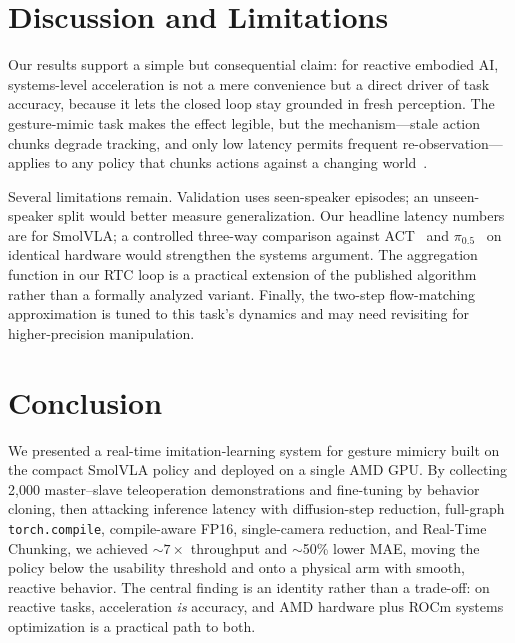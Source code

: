 \documentclass[blind]{gtac}
\begin{document}
\section{Discussion and Limitations}
\label{sec:discussion}

Our results support a simple but consequential claim: for reactive embodied AI,
systems-level acceleration is not a mere convenience but a direct driver of task
accuracy, because it lets the closed loop stay grounded in fresh perception. The
gesture-mimic task makes the effect legible, but the mechanism---stale action
chunks degrade tracking, and only low latency permits frequent
re-observation---applies to any policy that chunks actions against a changing
world~\cite{rtc}.

Several limitations remain. Validation uses seen-speaker episodes; an
unseen-speaker split would better measure generalization. Our headline latency
numbers are for SmolVLA; a controlled three-way comparison against
ACT~\cite{act} and $\pi_{0.5}$~\cite{pi05} on identical hardware would strengthen
the systems argument. The aggregation function in our RTC loop is a practical
extension of the published algorithm~\cite{rtc,smolvla} rather than a formally
analyzed variant. Finally, the two-step flow-matching approximation is tuned to
this task's dynamics and may need revisiting for higher-precision manipulation.

\section{Conclusion}
\label{sec:conclusion}

We presented a real-time imitation-learning system for gesture mimicry built on
the compact SmolVLA policy and deployed on a single AMD GPU. By collecting 2{,}000
master--slave teleoperation demonstrations and fine-tuning by behavior cloning,
then attacking inference latency with diffusion-step reduction, full-graph
\texttt{torch.compile}, compile-aware FP16, single-camera reduction, and
Real-Time Chunking, we achieved $\sim7\times$ throughput and $\sim$50\% lower MAE,
moving the policy below the usability threshold and onto a physical arm with
smooth, reactive behavior. The central finding is an identity rather than a
trade-off: on reactive tasks, acceleration \emph{is} accuracy, and AMD hardware
plus ROCm systems optimization is a practical path to both.

\begingroup
\let\itshape\upshape


\endgroup
\end{document}
